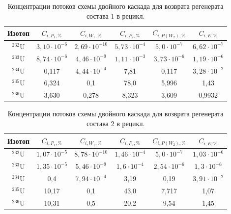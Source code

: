 \begin{table}[ht]
  \caption{Концентрации потоков схемы двойного каскада для возврата регенерата состава 1 в рецикл.{\label{pure_double1}}}
  \begin{tabular}{|c||c|c|c|c|c|}
      \hline Изотоп & $C_{i,P_{1}, \%}$ & $C_{i,W_{1}, \%}$ & $C_{i,P_{2}, \%}$ & $C_{i,P(W_{2}), \%}$ & $C_{i,E, \%}$\\ \hline
      $^{232}$U & $3,10\cdot10^{-6}$ & $2,69\cdot10^{-10}$ & $5,73\cdot10^{-4}$ & $5,0\cdot10^{-7}$ & $6,62\cdot10^{-7}$ \\ \hline
      $^{233}$U & $8,74\cdot10^{-6}$ & $4,46\cdot10^{-9}$ & $1,11\cdot10^{-3}$ & $3,73\cdot10^{-6}$ & $1,19\cdot10^{-6}$ \\ \hline
      $^{234}$U & 0,117 & $4,44\cdot10^{-4}$ & 7,81 & 0,117 & $3,28\cdot10^{-2}$ \\ \hline
      $^{235}$U & 6,324 & 0,1 & 78,0 & 5,996 & 1,43 \\ \hline
      $^{236}$U & 3,630 & 0,278 & 8,323 & 3,609 & 0,9932 \\ \hline
      \end{tabular}     
\end{table}

\begin{table}[ht]
  \caption{Концентрации потоков схемы двойного каскада для возврата регенерата состава 2 в рецикл.{\label{pure_double2}}}
  \begin{tabular}{|c||c|c|c|c|c|}
      \hline Изотоп & $C_{i,P_{1}, \%}$ & $C_{i,W_{1}, \%}$ & $C_{i,P_{2}, \%}$ & $C_{i,P(W_{2}), \%}$ & $C_{i,E, \%}$\\ \hline
      $^{232}$U & $1,07\cdot10^{-5}$ & $8,78\cdot10^{-10}$ & $1,46\cdot10^{-4}$ & $5,0\cdot10^{-7}$ & $1,03\cdot10^{-6}$ \\ \hline
      $^{233}$U & $1,35\cdot10^{-5}$ & $5,46\cdot10^{-9}$ & $1,6\cdot10^{-4}$ & $2,54\cdot10^{-6}$ & $1,3\cdot10^{-6}$ \\ \hline
      $^{234}$U & 0,4 & $7,94\cdot10^{-4}$ & 3,19 & 0,19 & $3,91\cdot10^{-2}$ \\ \hline
      $^{235}$U & 10,17 & 0,1 & 43,0 & 7,717 & 1,07 \\ \hline
      $^{236}$U & 10,31 & 0,5 & 20,2 & 9,54 & 1,45 \\ \hline
      \end{tabular}     
\end{table}

